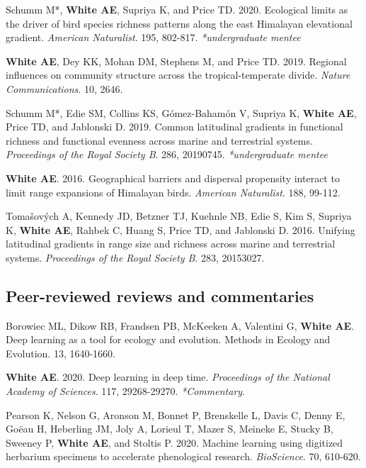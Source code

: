 \documentclass[letterpaper]{article}
\newenvironment{biblist}{%
   \begin{list}{}{%
     \setlength{\labelwidth}{0pt}%
     \setlength{\labelsep}{1em}%
     \setlength{\leftmargin}{2em}%
     \setlength{\itemindent}{-1em}%
   }
}{\end{list}}
\begin{document}
\begin{biblist}
\item  Schumm M*, \textbf{White AE}, Supriya K, and Price TD. 2020. Ecological limits as the driver of bird species richness patterns along the east Himalayan elevational gradient. \textit{American Naturalist}. 195, 802-817. \textit{*undergraduate mentee}

\item \textbf{White AE}, Dey KK, Mohan DM, Stephens M, and Price TD. 2019. Regional influences on community structure across the tropical-temperate divide. \textit{Nature Communications}. 10, 2646.

\item  Schumm M*, Edie SM, Collins KS, Gómez-Bahamón V, Supriya K, \textbf{White AE}, Price TD, and Jablonski D. 2019. Common latitudinal gradients in functional richness and functional evenness across marine and terrestrial systems. \textit{Proceedings of the Royal Society B}. 286, 20190745. \textit{*undergraduate mentee}

\item \textbf{White AE}. 2016. Geographical barriers and dispersal propensity interact to limit range expansions of Himalayan birds. \textit{American Naturalist}. 188, 99-112.

\item  Tomašových A, Kennedy JD, Betzner TJ,  Kuehnle NB, Edie S, Kim S, Supriya K, \textbf{White AE}, Rahbek C, Huang S, Price TD, and Jablonski D. 2016. Unifying latitudinal gradients in range size and  richness across marine and terrestrial systems. \textit{Proceedings of the Royal Society B}. 283, 20153027.
\end{biblist}

\subsection*{Peer-reviewed reviews and commentaries}
\begin{biblist}
\item Borowiec ML, Dikow RB, Frandsen PB, McKeeken A, Valentini G, \textbf{White AE}. Deep learning as a tool for ecology and evolution. Methods in Ecology and Evolution. 13, 1640-1660.

\item \textbf{White AE}. 2020. Deep learning in deep time. \textit{Proceedings of the National Academy of Sciences}. 117, 29268-29270. \textit{*Commentary}.

\item Pearson K, Nelson G, Aronson M, Bonnet P, Brenskelle L, Davis C, Denny E, Goëau H, Heberling JM, Joly A, Lorieul T, Mazer S, Meineke E, Stucky B, Sweeney P,\textbf{ White AE}, and Stoltis P. 2020. Machine learning using digitized herbarium specimens to accelerate phenological research. \textit{BioScience}. 70, 610-620.
\end{biblist}
\end{document}
